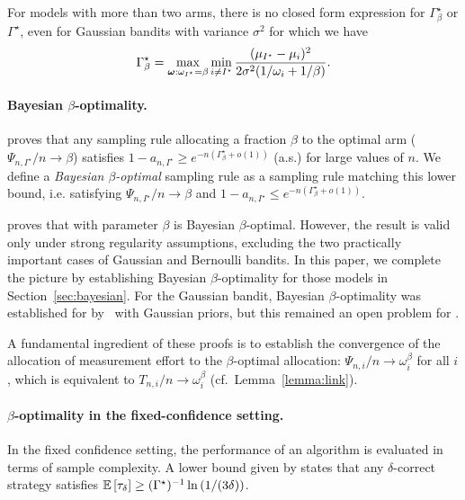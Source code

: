 For models with more than two arms, there is no closed form expression for $\Gamma_\beta^\star$ or $\Gamma^\star$, even for Gaussian bandits  with variance $\sigma^2$ for which we have
\[
    \Gamma_{\beta}^\star = \max_{{\boldsymbol \omega}:\omega_{I^\star}=\beta}\min_{i\neq I^\star} \frac{(\mu_{I^\star}-\mu_i)^2}{2\sigma^2(1/\omega_i+1/\beta)}.
\]


\paragraph{Bayesian \texorpdfstring{$\beta$}{}-optimality.} \citet{russo2016ttts} proves that  any sampling rule allocating a fraction $\beta$ to the optimal arm ($\Psi_{n,I^\star}/n \rightarrow \beta$) satisfies %
$1-a_{n, I^\star} \geq e^{-n(\Gamma_{\beta}^\star + o(1))}$ (a.s.) for large values of $n$. We define a  \emph{Bayesian $\beta$-optimal} sampling rule as a sampling rule matching this lower bound, i.e. satisfying $\Psi_{n,I^\star}/n \rightarrow \beta$ and $1- a_{n, I^\star} \leq e^{-n(\Gamma_{\beta}^\star + o(1))}$.

\citet{russo2016ttts} proves that \TTTS with parameter $\beta$ is Bayesian $\beta$-optimal.
However, the result is valid only under strong regularity assumptions, excluding the two practically important cases of Gaussian and Bernoulli bandits. In this paper, we complete the picture by establishing Bayesian $\beta$-optimality for those models in Section~\ref{sec:bayesian}. For the Gaussian bandit, Bayesian $\beta$-optimality was established for \TTEI by~\cite{qin2017ttei} with Gaussian priors, but this remained an open problem for \TTTS.

A fundamental ingredient of these proofs is to establish the convergence of the allocation of measurement effort to the $\beta$-optimal allocation: $\Psi_{n,i}/n \rightarrow \omega_{i}^\beta$ for all $i$, which is equivalent to $T_{n,i}/n \rightarrow \omega_{i}^\beta$ (cf.\ Lemma~\ref{lemma:link}).

\paragraph{\texorpdfstring{$\beta$}{}-optimality in the fixed-confidence setting.} In the fixed confidence setting, the performance of an algorithm is evaluated in terms of sample complexity. A lower bound given by \cite{garivier2016tracknstop} states that any $\delta$-correct strategy satisfies $\mathbb{E}\left[\tau_\delta\right] \geq (\Gamma^\star)^{-1} \ln \left({1}/(3\delta)\right)$. 


